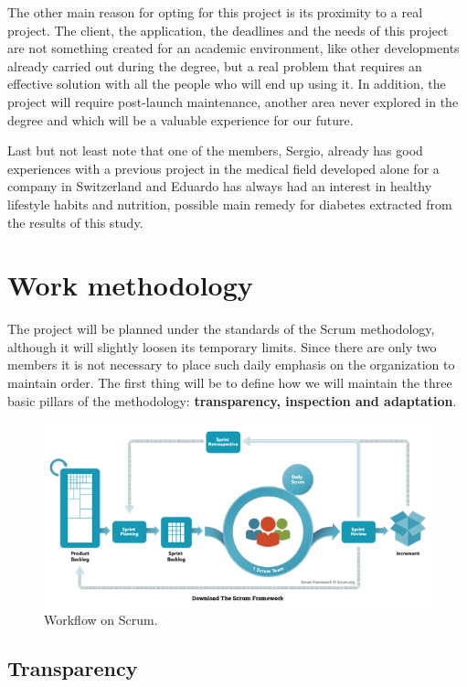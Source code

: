 	The other main reason for opting for this project is its proximity to a real project. The client, the application, the deadlines and the needs of this project are not something created for an academic environment, like other developments already carried out during the degree, but a real problem that requires an effective solution with all the people who will end up using it. In addition, the project will require post-launch maintenance, another area never explored in the degree and which will be a valuable experience for our future.\newline
	
	Last but not least note that one of the members, Sergio, already has good experiences with a previous project in the medical field developed alone for a company in Switzerland and Eduardo has always had an interest in healthy lifestyle habits and nutrition, possible main remedy for diabetes extracted from the results of this study.\newpage

	\section{Work methodology}
    
    The project will be planned under the standards of the Scrum\cite{Scrum} methodology, although it will slightly loosen its temporary limits. Since there are only two members it is not necessary to place such daily emphasis on the organization to maintain order. The first thing will be to define how we will maintain the three basic pillars of the methodology: \textbf{transparency, inspection and adaptation}.
    
    \begin{figure}[h]
    \centering
     \includegraphics[width=1\textwidth]{images/Scrum.png}
    \caption{Workflow on Scrum.}
    \end{figure}
    
    \subsection{Transparency}

